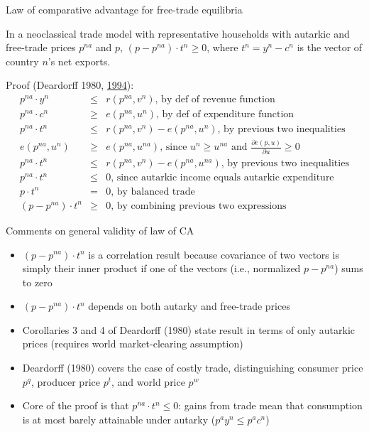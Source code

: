 \documentclass[10pt,notes=hide]{beamer}
\begin{document}
\begin{frame}{Law of comparative advantage for free-trade equilibria}
\begin{theorem}
In a neoclassical trade model with representative households
with autarkic and free-trade prices $p^{na}$ and $p$, 
$\left(p-p^{na}\right) \cdot t^{n} \geq 0$, 
where $t^{n}=y^{n}-c^{n}$ is the vector of country $n$'s net exports.
\end{theorem}
Proof (Deardorff 1980, \href{https://www.jstor.org/stable/40440263}{1994}):
\begin{eqnarray*}
p^{na}\cdot y^{n} &\leq &r\left( p^{na},v^{n}\right) \text{, \ \ by def of revenue function} \\
p^{na}\cdot c^{n} &\geq &e\left( p^{na},u^{n}\right) \text{, \ \ by def of expenditure function} \\
p^{na}\cdot t^{n} &\leq &r\left( p^{na},v^{n}\right) -e\left( p^{na},u^{n}\right) \text{, \ \ by previous two inequalities} \\
e\left( p^{na},u^{n}\right) &\geq &e\left( p^{na},u^{na}\right) \text{,
since }u^{n}\geq u^{na}\text{ and } \frac{\partial e\left( p,u\right)}{\partial u} \geq 0 \\
p^{na}\cdot t^{n} &\leq &r\left( p^{na},v^{n}\right) -e\left(
p^{na},u^{na}\right) \text{, by previous two inequalities} \\
p^{na}\cdot t^{n} &\leq &0\text{, since autarkic income equals autarkic expenditure}
\\
p \cdot t^{n} &=&0\text{, by balanced trade} \\
\left( p-p^{na}\right) \cdot t^{n} &\geq &0\text{, by combining previous two expressions }
\end{eqnarray*}
\end{frame}
\begin{frame}{Comments on general validity of law of CA}
\begin{itemize}
	\item $\left(p-p^{na}\right) \cdot t^{n}$ is a correlation result because covariance of two vectors is simply their inner product if one of the vectors (i.e., normalized $p-p^{na}$) sums to zero
	\item $\left(p-p^{na}\right) \cdot t^{n}$ depends on both autarky and free-trade prices
	\item Corollaries 3 and 4 of Deardorff (1980) state result in terms of only autarkic prices (requires world market-clearing assumption)
	\item Deardorff (1980) covers the case of costly trade, distinguishing	 consumer price $p^q$, producer price $p^t$, and world price $p^w$
	\item Core of the proof is that $p^{na} \cdot t^n \leq 0$: gains from trade mean that consumption is at most barely attainable under autarky ($p^a y^n \leq p^a c^n$) 
\end{itemize}
\end{frame}
\end{document}

